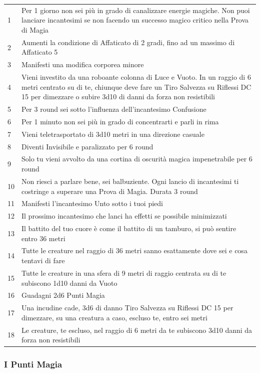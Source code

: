 \begin{multicols}{2}
\noindent\begin{tabularx}{0.5\textwidth}{lX}
\hline
1 & Per 1 giorno non sei più in grado di canalizzare energie magiche. Non puoi lanciare incantesimi se non facendo un successo magico critico nella Prova di Magia\\
2 & Aumenti la condizione di Affaticato di 2 gradi, fino ad un massimo di Affaticato 5\\
3 & Manifesti una modifica corporea minore\\
4 & Vieni investito da una roboante colonna di Luce e Vuoto. In un raggio di 6 metri centrato su di te, chiunque deve fare un Tiro Salvezza su Riflessi DC 15 per dimezzare o subire 3d10 di danni da forza non resistibili\\
5 & Per 3 round sei sotto l'influenza dell'incantesimo Confusione\\
6 & Per 1 minuto non sei più in grado di concentrarti e parli in rima\\
7 & Vieni teletrasportato di 3d10 metri in una direzione casuale\\
8 & Diventi Invisibile e paralizzato per 6 round\\
9 & Solo tu vieni avvolto da una cortina di oscurità magica impenetrabile per 6 round\\
10 & Non riesci a parlare bene, sei balbuziente. Ogni lancio di incantesimi ti costringe a superare una Prova di Magia. Durata 3 round\\
11 & Manifesti l'incantesimo Unto sotto i tuoi piedi\\
12 & Il prossimo incantesimo che lanci ha effetti se possibile minimizzati\\
13 & Il battito del tuo cuore è come il battito di un tamburo, si può sentire entro 36 metri\\
14 & Tutte le creature nel raggio di 36 metri sanno esattamente dove sei e cosa tentavi di fare\\
15 & Tutte le creature in una sfera di 9 metri di raggio centrata su di te subiscono 1d10 danni da Vuoto\\
16 & Guadagni 2d6 Punti Magia\\
17 & Una incudine cade, 3d6 di danno Tiro Salvezza su Riflessi DC 15 per dimezzare, su una creatura a caso, escluso te, entro sei metri\\
18 & Le creature, te escluso, nel raggio di 6 metri da te subiscono 3d10 danni da forza non resistibili
\end{tabularx}

\subsubsection{I Punti Magia}\label{magiepuntimagia}\hypertarget{magiepuntimagia}{}


\end{multicols}
